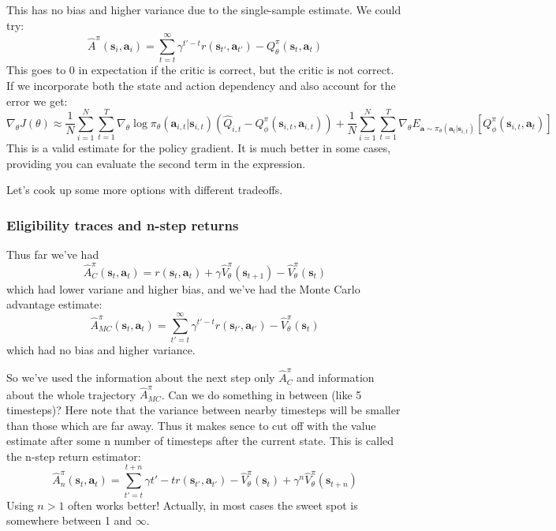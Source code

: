 \documentclass{report}
\begin{document}
This has no bias and higher variance due to the single-sample estimate.
We could  try:
\begin{equation}
		\hat{A}^\pi (\bm{s}_{i}, \bm{a}_{i}) = \sum_{t=t}^{\infty} \gamma^{t'-t} r(\bm{s}_{t'}, \bm{a}_{t'}) - Q^\pi_\theta(\bm{s}_t, \bm{a}_t)
\end{equation}
This goes to 0 in expectation if the critic is correct, but the critic is not correct.
If we incorporate both the state and action dependency and also account for the error we get:
\begin{equation}
		\nabla_\theta J(\theta) \approx \frac{1}{N} \sum_{i=1}^{N} \sum_{t=1}^{T} \nabla_{\theta} \log \pi_\theta(\bm{a}_{i,t}|\bm{s}_{i,t})
		\left( \hat{Q}_{i,t} - Q^\pi_\phi (\bm{s}_{i,t}, \bm{a}_{i,t})  \right) 
		+ \frac{1}{N} \sum_{i=1}^{N} \sum_{t=1}^{T} \nabla_{\theta}
		E_{\bm{a} \sim \pi_\theta(\bm{a}_t|\bm{s}_{i,t})}
		\left[ Q^\pi_\phi (\bm{s}_{i,t}, \bm{a}_{t}) \right] 
\end{equation}
This is a valid estimate for the policy gradient.
It is much better in some cases, providing you can evaluate the second term in the expression.

Let's cook up some more options with different tradeoffs.

\subsubsection{Eligibility traces and n-step returns}
Thus far we've had
\begin{equation}
\hat{A}^\pi_C (\bm{s}_{t}, \bm{a}_{t}) =
r(\bm{s}_{t}, \bm{a}_{t}) + \gamma \hat{V}^\pi_\theta(\bm{s}_{t+1}) - \hat{V}^\pi_\theta(\bm{s}_t)
\end{equation}
which had lower variane and higher bias,
and we've had the Monte Carlo advantage estimate:
\begin{equation}
		\hat{A}^\pi_{MC} (\bm{s}_{t}, \bm{a}_{t}) =
		\sum_{t'=t}^{\infty}  \gamma^{t'-t} r(\bm{s}_{t'}, \bm{a}_{t'})  - \hat{V}^\pi_\theta(\bm{s}_t)
\end{equation}
which had no bias and higher variance.

So we've used the information about the next step only $\hat{A}^\pi_C$ and information about 
the whole trajectory $\hat{A}^\pi_{MC}$.
Can we do something in between (like 5 timesteps)?
Here note that the variance between nearby timesteps will be smaller than those which are far away.
Thus it makes sence to cut off with the value estimate after some n number of timesteps after the current state.
This is called the n-step return estimator:
\begin{equation}
		\hat{A}^\pi_n (\bm{s}_{t}, \bm{a}_{t}) =
		\sum_{t'=t}^{t+n} \gamma{t'-t} r(\bm{s}_{t'}, \bm{a}_{t'})
		- \hat{V}^\pi_\theta(\bm{s}_t) + \gamma^n \hat{V}^\pi_\theta(\bm{s}_{t+n})
\end{equation}
Using $n>1$ often works better! Actually, in most cases
the sweet spot is somewhere between 1 and $\infty$.
\end{document}
